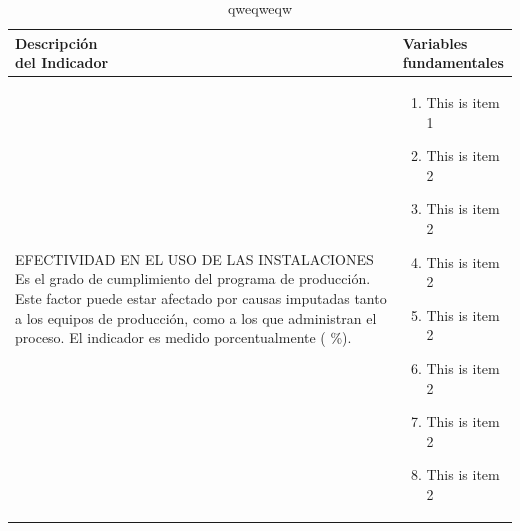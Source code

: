 \begin{table}
    \caption{qweqweqw}
    \label{qweqweqwe}
    \begin{tabular}{|p{6cm}|p{6cm}|}
        \hline
        \thead{Descripci\'on \\del Indicador} & \thead{Variables \\fundamentales} \\ \hline
        \begin{minipage}{2in}
            EFECTIVIDAD EN EL USO DE LAS INSTALACIONES
    Es el grado de cumplimiento del programa de
    producci\'on. Este factor puede estar afectado por
    causas imputadas tanto a los equipos de producci\'on, como a los que administran el proceso. El
    indicador es medido porcentualmente ( \%).
        \end{minipage}

         &
        \begin{minipage}{5in}
            \vskip 4pt
            \begin{enumerate}
                \item This is item 1
                \item This is item 2
                \item This is item 2
                \item This is item 2
                \item This is item 2
                \item This is item 2
                \item This is item 2
                \item This is item 2
            \end{enumerate}
            \vskip 4pt
        \end{minipage}
        \\
        \hline
    \end{tabular}

\end{table}
